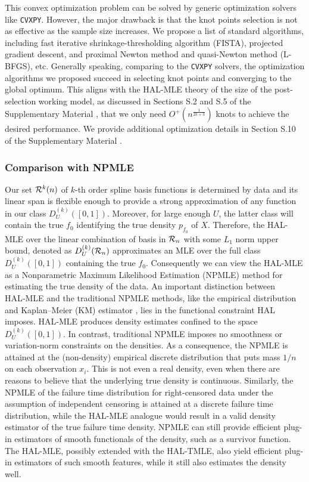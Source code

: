 \begin{remark}
This convex optimization problem can be solved by generic optimization solvers like \texttt{CVXPY}. However, the major drawback is that the knot points selection is not as effective as the sample size increases. We propose a list of standard algorithms, including fast iterative shrinkage-thresholding algorithm (FISTA), projected gradient descent, and proximal Newton method and quasi-Newton method (L-BFGS), etc. Generally speaking, comparing to the \texttt{CVXPY} solvers, the optimization algorithms we proposed succeed in selecting knot points and converging to the global optimum. This aligns with the HAL-MLE theory of the size of the post-selection working model, as discussed in Sections S.2 and S.5 of the Supplementary Material \citep{hou2026supplement}, that we only need $O^+(n^{\frac{1}{2k+3}})$ knots to achieve the desired performance. We provide additional optimization details in Section S.10 of the Supplementary Material \citep{hou2026supplement}.
\end{remark}

\subsubsection{Comparison with NPMLE} \label{subsec:comparison-with-npmle}
Our set ${\cal R}^k(n)$ of $k$-th order spline basis functions is determined by data and its linear span is flexible enough to provide a strong approximation of any function in our class $D^{(k)}_U([0,1])$. Moreover, for large enough $U$, the latter class will contain the true $f_0$ identifying the true density $p_{f_0}$ of $X$. 
Therefore, the HAL-MLE over the linear combination of basis in ${\cal R}_n$ with some $L_1$ norm upper bound, denoted as $D^{(k)}_U({\cal R}_n)$ approximates an MLE over the full class $D^{(k)}_U([0,1])$ containing the true $f_0$. Consequently we can view the HAL-MLE as  a Nonparametric Maximum Likelihood Estimation (NPMLE) method for estimating the true density of the data. An important distinction between HAL‑MLE and the traditional NPMLE methods, like the empirical distribution and Kaplan–Meier (KM) estimator \citep{kaplan1958nonparametric}, lies in the functional constraint HAL imposes. HAL‑MLE produces density estimates confined to the space $D^{(k)}_U([0,1])$. In contrast, traditional NPMLE imposes no smoothness or variation‑norm constraints on the densities. As a consequence, the NPMLE is attained at the (non-density) empirical discrete distribution that puts mass $1/n$ on each observation $x_i$. This is not even a real density, even when there are reasons to believe that the underlying true density is continuous. Similarly, the NPMLE of the failure time distribution for right-censored data under the assumption of independent censoring  is attained at a discrete failure time distribution, while the HAL-MLE analogue would result in a valid density estimator of the true failure time density.  
NPMLE can still provide efficient plug-in estimators of smooth functionals of the density, such as a survivor function. The HAL-MLE, possibly extended with the HAL-TMLE, also yield efficient plug-in estimators of such smooth features, while it still also estimates the density well.
